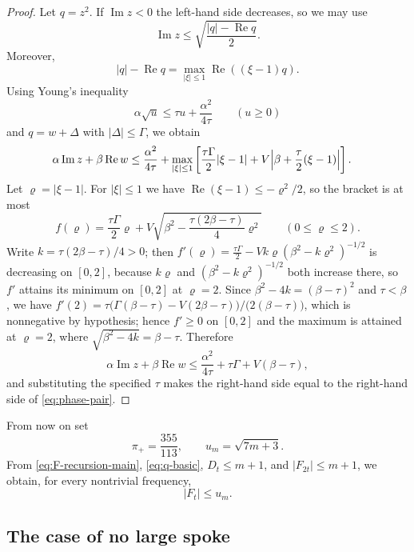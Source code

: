 \documentclass[11pt]{article}
\theoremstyle{definition}
\theoremstyle{remark}
\numberwithin{equation}{section}
\DeclarePairedDelimiter{\abs}{\lvert}{\rvert}
\begin{document}
\begin{proof}
Let $q=z^2$. If $\operatorname{Im}z<0$ the left-hand side decreases, so we may use
\[
  \operatorname{Im}z
  \le\sqrt{\frac{|q|-\operatorname{Re}q}{2}}.
\]
Moreover,
\[
  |q|-\operatorname{Re}q
  =\max_{|\xi|\le1}\operatorname{Re}((\xi-1)q).
\]
Using Young's inequality
\[
  \alpha\sqrt u\le\tau u+\frac{\alpha^2}{4\tau}
  \qquad(u\ge0)
\]
and $q=w+\Delta$ with $|\Delta|\le \Gamma$, we obtain
\[
\begin{aligned}
 \alpha\operatorname{Im}z+\beta\operatorname{Re}w
 \le{}&\frac{\alpha^2}{4\tau}
 +\max_{|\xi|\le1}
 \left[
   \frac{\tau \Gamma}{2}|\xi-1|
   +V\abs*{\beta+\frac\tau2(\xi-1)}
 \right].
\end{aligned}
\]
Let $\varrho=|\xi-1|$. For $|\xi|\le1$ we have
$\operatorname{Re}(\xi-1)\le-\varrho^2/2$, so the bracket is at most
\[
  f(\varrho)=\frac{\tau \Gamma}{2}\varrho+
  V\sqrt{\beta^2-
  \frac{\tau(2\beta-\tau)}4\varrho^2}
  \qquad(0\le \varrho\le2).
\]
Write $k=\tau(2\beta-\tau)/4>0$; then
$f'(\varrho)=\tfrac{\tau \Gamma}2-Vk\varrho(\beta^2-k\varrho^2)^{-1/2}$ is decreasing on $[0,2]$,
because $k\varrho$ and $(\beta^2-k\varrho^2)^{-1/2}$ both increase there, so $f'$ attains
its minimum on $[0,2]$ at $\varrho=2$. Since $\beta^2-4k=(\beta-\tau)^2$ and
$\tau<\beta$, we have
$f'(2)=\tau\bigl(\Gamma(\beta-\tau)-V(2\beta-\tau)\bigr)/\bigl(2(\beta-\tau)\bigr)$,
which is nonnegative by hypothesis; hence $f'\ge0$ on $[0,2]$ and the maximum
is attained at $\varrho=2$, where $\sqrt{\beta^2-4k}=\beta-\tau$. Therefore
\[
  \alpha\operatorname{Im}z+\beta\operatorname{Re}w
  \le\frac{\alpha^2}{4\tau}+\tau \Gamma+V(\beta-\tau),
\]
and substituting the specified $\tau$ makes the right-hand side equal to the right-hand side of \eqref{eq:phase-pair}.
\end{proof}

From now on set
\[
  \pi_+=\frac{355}{113},
  \qquad
  u_m=\sqrt{7m+3}.
\]
From \eqref{eq:F-recursion-main}, \eqref{eq:q-basic}, $D_t\le m+1$, and $|F_{2t}|\le m+1$, we obtain, for every nontrivial frequency,
\begin{equation}\label{eq:u-bound}
  |F_t|\le u_m.
\end{equation}

\subsection{The case of no large spoke}\label{ssec:h0}
\end{document}
